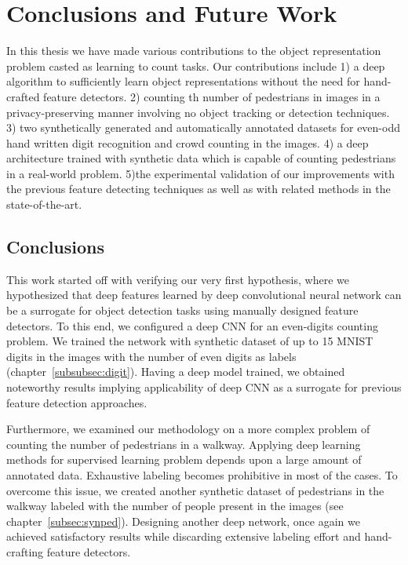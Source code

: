 \newpage

\chapter{Conclusions and Future Work}
\label{sec:conclusions}

\noindent In this thesis we have made various contributions to the object representation problem casted as learning to count tasks. Our contributions include 1) a deep algorithm to sufficiently learn object representations without the need for hand-crafted feature detectors. 2) counting th number of pedestrians in images in a privacy-preserving manner involving no object tracking or detection techniques. 3) two synthetically generated and automatically annotated datasets for even-odd hand written digit recognition and crowd counting in the images. 4) a deep architecture trained with synthetic data which is capable of counting pedestrians in a real-world problem. 5)the experimental validation of our improvements with the previous feature detecting techniques as well as with related methods in the state-of-the-art. 

\section{Conclusions}

This work started off with verifying our very first hypothesis, where we hypothesized that deep features learned by deep convolutional neural network can be a surrogate for object detection tasks using manually designed feature detectors. To this end, we configured a deep CNN for an even-digits counting problem. We trained the network with synthetic dataset of up to 15 MNIST digits in the images with the number of even digits as labels (chapter~\ref{subsubsec:digit}). Having a deep model trained, we obtained noteworthy results implying applicability of deep CNN as a surrogate for previous feature detection approaches.

\indent Furthermore, we examined our methodology on a more complex problem of counting the number of pedestrians in a walkway. Applying deep learning methods for supervised learning problem depends upon a large amount of annotated data. Exhaustive labeling becomes prohibitive in most of the cases. To overcome this issue, we created another synthetic dataset of pedestrians in the walkway labeled with the number of people present in the images (see chapter~\ref{subsec:synped}). Designing another deep network, once again we achieved satisfactory results while discarding extensive labeling effort and hand-crafting feature detectors.   


